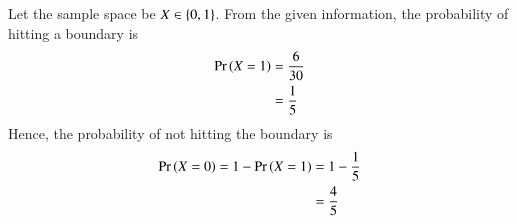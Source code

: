 Let the sample space be $X \in \left\{0,1\right\}$.  From the given information, the probability of hitting a boundary is
\begin{align}
\Pr\left(X = 1\right)
 &= \frac{6}{30}
\\
&= \frac{1}{5}
\end{align}
%
Hence, the probability of not hitting the boundary is
\begin{align}
\Pr\left(X = 0\right) = 
1 - \Pr\left(X = 1\right) &= 1-\frac{1}{5}
\\
&= \frac{4}{5}
\end{align}
